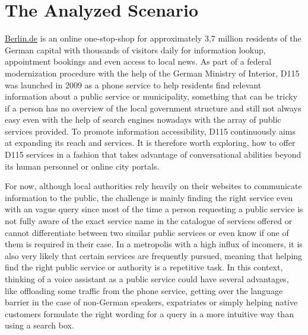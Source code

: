 \section{The Analyzed Scenario}
\label{pubsvc}
\href{https://www.berlin.de}{Berlin.de} is an online one-stop-shop for approximately 3,7 million residents of the German capital\cite{zensus} with thousands of visitors daily for information lookup, appointment bookings and even access to local news.
As part of a federal modernization procedure with the help of the German Ministry of Interior, D115 was launched in 2009 \cite{d115} as a phone service to help residents find relevant information about a public service or municipality, something that can be tricky if a person has no overview of the local government structure and still not always easy even with the help of search engines nowadays with the array of public services provided.
To promote information accessibility, D115 continuously aims at expanding its reach and services.
It is therefore worth exploring, how to offer D115 services in a fashion that takes advantage of conversational abilities beyond its human personnel or online city portals. 


For now, although local authorities rely heavily on their websites to communicate information to the public, the challenge is mainly finding the right service even with an vague query since most of the time a person requesting a public service is not fully aware of the exact service name in the catalogue of services offered or cannot differentiate between two similar public services or even know if one of them is required in their case.
In a metropolis with a high influx of incomers, it is also very likely that certain services are frequently pursued, meaning that helping find the right public service or authority is a repetitive task. In this context, thinking of a voice assistant as a public service could have several advantages, like offloading some traffic from the phone service, getting over the language barrier in the case of non-German speakers, expatriates or simply helping native customers formulate the right wording for a query in a more intuitive way than using a search box. 

